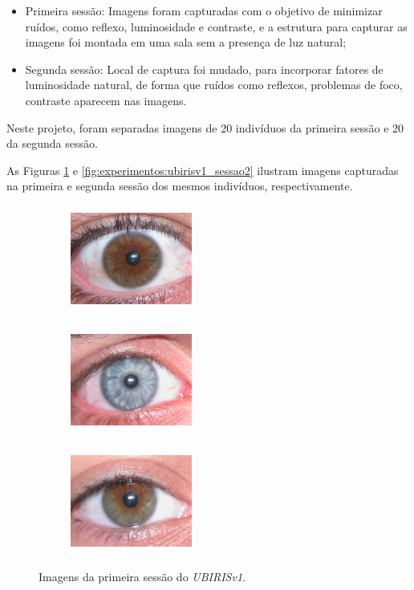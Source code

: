 \begin{itemize}
    \item Primeira sessão: Imagens foram capturadas com o objetivo de minimizar ruídos, como reflexo, luminosidade e contraste, e a estrutura para capturar as imagens foi montada em uma sala sem a presença de luz natural;
    \item Segunda sessão: Local de captura foi mudado, para incorporar fatores de luminosidade natural, de forma que ruídos como reflexos, problemas de foco, contraste aparecem nas imagens.
\end{itemize}

\par Neste projeto, foram separadas imagens de 20 indivíduos da primeira sessão e 20 da segunda sessão.

\par As Figuras \ref{fig:experimentos:ubirisv1_sessao1} e \ref{fig:experimentos:ubirisv1_sessao2} ilustram imagens capturadas na primeira e segunda sessão dos mesmos indivíduos, respectivamente.

\begin{figure}[h!]
\begin{subfigure}{.3\textwidth}
\centering
\includegraphics[width=4cm,height=3.5cm]{img/Resultados/ubirisv1/sessao1_1.jpg}
\end{subfigure}\hfill
\begin{subfigure}{.3\textwidth}
\centering
\includegraphics[width=4cm,height=3.5cm]{img/Resultados/ubirisv1/sessao1_55.jpg}
\end{subfigure}\hfill
\begin{subfigure}{.3\textwidth}
\centering
\includegraphics[width=4cm,height=3.5cm]{img/Resultados/ubirisv1/sessao1_76.jpg}
\end{subfigure}
\caption{Imagens da primeira sessão do \textit{UBIRISv1}.}
\label{fig:experimentos:ubirisv1_sessao1}
\end{figure}

